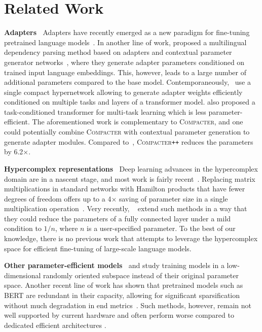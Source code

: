\documentclass{article}
\newcommand{\compacter}{\textsc{Compacter}\xspace}
\newcommand{\compacteronlyff}{\textsc{Compacter}\texttt{++}\xspace} %
\begin{document}
\section{Related Work}
\noindent \textbf{Adapters} $\:$ Adapters have recently emerged as a new paradigm for fine-tuning pretrained language models~\citep{houlsby2019parameter}. In another line of work, \citet{ustun2020udapter} proposed a multilingual dependency parsing method based on adapters and contextual parameter generator networks~\citep{platanios2018contextual}, where they generate adapter parameters conditioned on trained input language embeddings. This, however, leads to a large number of additional parameters compared to the base model. Contemporaneously,~\citet{karimi2021parameter-efficient}  use a single compact hypernetwork allowing to generate adapter weights efficiently conditioned on multiple tasks and layers of a transformer model. \citet{pilault2021conditionally} also proposed a task-conditioned transformer for multi-task learning which is less parameter-efficient. The aforementioned work is complementary to \compacter, and one could potentially combine \compacter with contextual parameter generation to generate adapter modules. Compared to~\citet{karimi2021parameter-efficient}, \compacteronlyff reduces the parameters by 6.2$\times$. 



\noindent \textbf{Hypercomplex representations} $\:$ Deep learning advances in the hypercomplex domain are in a nascent stage, and most work is fairly recent~\citep{gaudet2018deep, parcollet2018quaternion, parcollet2018quaternion_b, zhu2018quaternion, tay2019lightweight}. Replacing matrix multiplications in standard networks with Hamilton products that have fewer degrees of freedom offers up to a 4$\times$ saving of parameter size in a single multiplication operation~\citep{parcollet2018quaternion_b, tay2019lightweight}. Very recently, ~\citet{zhang2021beyond} extend such methods in a way that they could reduce the parameters of a fully connected layer under a mild condition to $1/n$, where $n$ is a user-specified parameter. To the best of our knowledge, there is no previous work that attempts to leverage the hypercomplex space for efficient fine-tuning of large-scale language models.


\noindent \textbf{Other parameter-efficient models} $\:$ \citet{li2018measuring} and \citet{aghajanyan2020intrinsic} study training models in  a low-dimensional randomly oriented subspace instead of their original parameter space. Another recent line of work has shown that pretrained models such as BERT are redundant in their capacity, allowing for significant sparsification without much degradation in end metrics~\citep{chen2020lottery, prasannaetal2020bert, desaietal2019evaluating}. Such methods, however, remain not well supported by current hardware and often perform worse compared to dedicated efficient architectures \citep{blalock2020state}.
\end{document}
